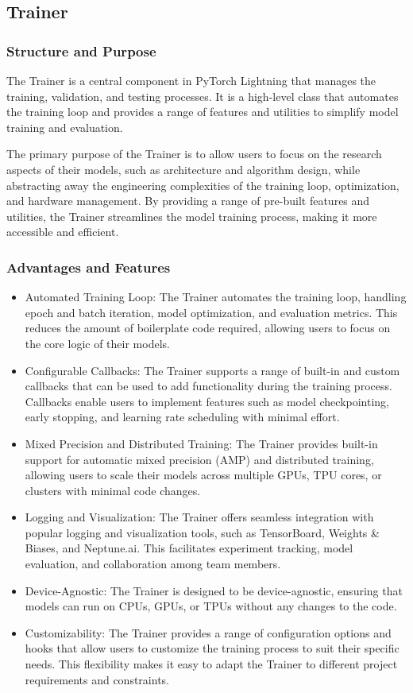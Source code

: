 \documentclass[12pt]{article}
\begin{document}
\subsection{Trainer}

\subsubsection{Structure and Purpose}

The Trainer is a central component in PyTorch Lightning that manages the training, validation, and testing processes.
It is a high-level class that automates the training loop and provides a range of features and utilities to simplify model training and evaluation.

The primary purpose of the Trainer is to allow users to focus on the research aspects of their models, such as architecture and algorithm design, while abstracting away the engineering complexities of the training loop, optimization, and hardware management.
By providing a range of pre-built features and utilities, the Trainer streamlines the model training process, making it more accessible and efficient.

\subsubsection{Advantages and Features}

\begin{itemize}
    \item Automated Training Loop: The Trainer automates the training loop, handling epoch and batch iteration, model optimization, and evaluation metrics. This reduces the amount of boilerplate code required, allowing users to focus on the core logic of their models.
    \item Configurable Callbacks: The Trainer supports a range of built-in and custom callbacks that can be used to add functionality during the training process. Callbacks enable users to implement features such as model checkpointing, early stopping, and learning rate scheduling with minimal effort.
    \item Mixed Precision and Distributed Training: The Trainer provides built-in support for automatic mixed precision (AMP) and distributed training, allowing users to scale their models across multiple GPUs, TPU cores, or clusters with minimal code changes.
    \item Logging and Visualization: The Trainer offers seamless integration with popular logging and visualization tools, such as TensorBoard, Weights \& Biases, and Neptune.ai. This facilitates experiment tracking, model evaluation, and collaboration among team members.
    \item Device-Agnostic: The Trainer is designed to be device-agnostic, ensuring that models can run on CPUs, GPUs, or TPUs without any changes to the code.
    \item Customizability: The Trainer provides a range of configuration options and hooks that allow users to customize the training process to suit their specific needs. This flexibility makes it easy to adapt the Trainer to different project requirements and constraints.
\end{itemize}
\end{document}
